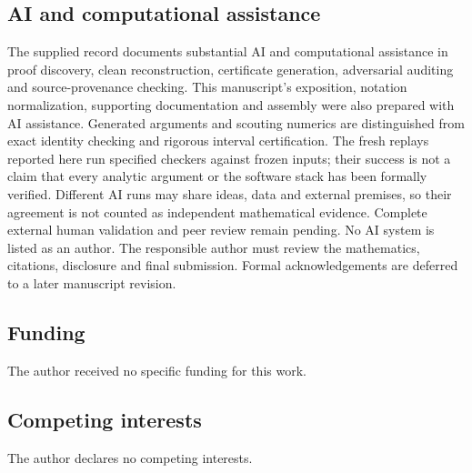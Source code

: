 \subsection*{AI and computational assistance}
The supplied record documents substantial AI and computational assistance
in proof discovery, clean reconstruction, certificate generation,
adversarial auditing and source-provenance checking. This manuscript's
exposition, notation normalization, supporting documentation and assembly
were also prepared with AI assistance. Generated arguments and scouting
numerics are distinguished from exact identity checking and rigorous
interval certification. The fresh replays reported here run specified
checkers against frozen inputs; their success is not a claim that every
analytic argument or the software stack has been formally verified.
Different AI runs may share ideas, data and external premises, so their
agreement is not counted as independent mathematical evidence.
Complete external human validation and peer review remain pending. No AI
system is listed as an author. The responsible
author must review the mathematics, citations, disclosure and final
submission. Formal acknowledgements are deferred to a later manuscript
revision.

\subsection*{Funding}
The author received no specific funding for this work.

\subsection*{Competing interests}
The author declares no competing interests.
